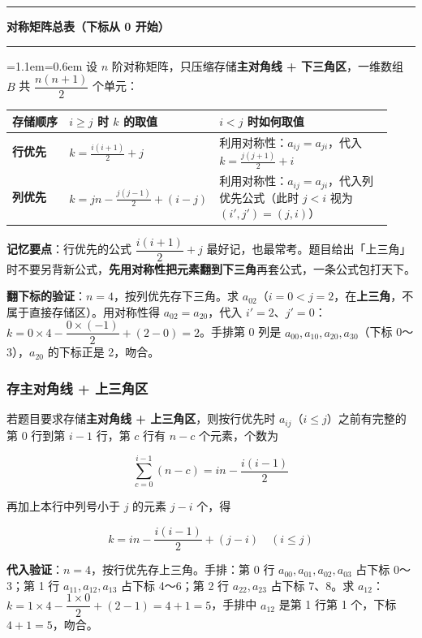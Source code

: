 \documentclass[11pt,openany,UTF8]{ctexbook}
\newcommand{\callouthead}[2]{%
  \par\addvspace{7pt}\noindent
  {\color{#1}\rule[-0.15em]{3pt}{1.05em}}\hspace{0.5em}%
  {\bfseries\color{#1}#2}\par\nobreak\vspace{-0.35em}%
  {\color{rulesep}\hrule height 0.4pt}\nobreak\vspace{0.45em}%
  \begingroup\small\setlength{\parindent}{0pt}%
  \leftskip=1.1em\rightskip=0.6em\noindent\ignorespaces}
\newcommand{\calloutend}{\par\endgroup\addvspace{7pt}}
\newenvironment{callkey}[1]{\callouthead{keybar}{#1}}{\calloutend}
\begin{document}
\begin{callkey}{对称矩阵总表（下标从 0 开始）}
设 $n$ 阶对称矩阵，只压缩存储\textbf{主对角线 + 下三角区}，一维数组 $B$ 共 $\dfrac{n(n+1)}{2}$ 个单元：

\begingroup\small\setlength{\tabcolsep}{4.0pt}
\begin{longtable}{@{}L{0.1923\linewidth}L{0.1923\linewidth}L{0.5438\linewidth}@{}}
\toprule
\textbf{存储顺序} & \textbf{$i \ge j$ 时 $k$ 的取值} & \textbf{$i < j$ 时如何取值} \\
\midrule
\endhead
\textbf{行优先} & $k = \frac{i(i+1)}{2} + j$ & 利用对称性：$a_{ij} = a_{ji}$，代入 $k = \frac{j(j+1)}{2} + i$ \\
\textbf{列优先} & $k = jn - \frac{j(j-1)}{2} + (i - j)$ & 利用对称性：$a_{ij} = a_{ji}$，代入列优先公式（此时 $j < i$ 视为 $(i',j') = (j,i)$） \\
\bottomrule
\end{longtable}
\endgroup

\textbf{记忆要点}：行优先的公式 $\dfrac{i(i+1)}{2} + j$ 最好记，也最常考。题目给出「上三角」时不要另背新公式，\textbf{先用对称性把元素翻到下三角}再套公式，一条公式包打天下。

\textbf{翻下标的验证}：$n = 4$，按列优先存下三角。求 $a_{02}$（$i=0<j=2$，在\textbf{上三角}，不属于直接存储区）。用对称性得 $a_{02} = a_{20}$，代入 $i'=2$、$j'=0$：$k = 0 \times 4 - \dfrac{0 \times (-1)}{2} + (2 - 0) = 2$。手排第 0 列是 $a_{00},a_{10},a_{20},a_{30}$（下标 0～3），$a_{20}$ 的下标正是 2，吻合。

\end{callkey}

\subsubsection{存主对角线 + 上三角区}

若题目要求存储\textbf{主对角线 + 上三角区}，则按行优先时 $a_{ij}$（$i \le j$）之前有完整的第 $0$ 行到第 $i-1$ 行，第 $c$ 行有 $n - c$ 个元素，个数为

\[\sum_{c=0}^{i-1}(n-c) = in - \frac{i(i-1)}{2}\]

再加上本行中列号小于 $j$ 的元素 $j - i$ 个，得

\[k = in - \frac{i(i-1)}{2} + (j - i) \quad (i \le j)\]

\textbf{代入验证}：$n = 4$，按行优先存上三角。手排：第 0 行 $a_{00},a_{01},a_{02},a_{03}$ 占下标 0～3；第 1 行 $a_{11},a_{12},a_{13}$ 占下标 4～6；第 2 行 $a_{22},a_{23}$ 占下标 7、8。求 $a_{12}$：$k = 1 \times 4 - \dfrac{1 \times 0}{2} + (2-1) = 4 + 1 = 5$，手排中 $a_{12}$ 是第 1 行第 1 个，下标 $4 + 1 = 5$，吻合。
\end{document}
